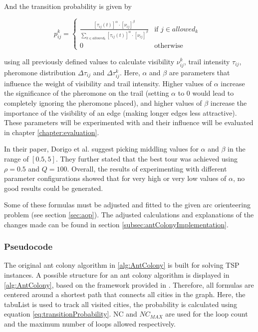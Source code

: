 And the transition probability is given by

\begin{equation}\label{eq:transitionProbability}
	p_{ij}^k = \begin{cases}
		\frac{[\tau_{ij}(t)]^{\alpha} \cdot [\nu_{ij}]^{\beta}}{\sum_{k \in allowed_k} [\tau_{ij}(t)]^{\alpha} \cdot [\nu_{ij}]^{\beta}} &\text{if $j \in allowed_k$ }\\
		0 &\text{otherwise}
	\end{cases}
\end{equation}

using all previously defined values to calculate visibility $\nu_{ij}^k$, trail intensity $\tau_{ij}$, pheromone distribution $\Delta\tau_{ij}$ and $\Delta\tau_{ij}^k$.
Here, $\alpha$ and $\beta$ are parameters that influence the weight of visibility and trail intensity.
Higher values of $\alpha$ increase the significance of the pheromone on the trail (setting $\alpha$ to 0 would lead to completely ignoring the pheromone placed), and higher values of $\beta$ increase the importance of the visibility of an edge (making longer edges less attractive).
These parameters will be experimented with and their influence will be evaluated in chapter \ref{chapter:evaluation}.

In their paper, Dorigo et al. suggest picking middling values for $\alpha$ and $\beta$ in the range of $[0.5,5]$.
They further stated that the best tour was achieved using $\rho = 0.5$ and $Q=100$.
Overall, the results of experimenting with different parameter configurations showed that for very high or very low values of $\alpha$, no good results could be generated.


Some of these formulas must be adjusted and fitted to the given arc orienteering problem (see section \ref{sec:aop}). 
The adjusted calculations and explanations of the changes made can be found in section \ref{subsec:antColonyImplementation}.


\subsubsection{Pseudocode}
\label{subsubsec:antPseudocode}

The original ant colony algorithm in \ref{alg:AntColony} is built for solving TSP instances. 
A possible structure for an ant colony algorithm is displayed in \ref{alg:AntColony}, based on the framework provided in \cite{dorigo_ant_1996}.
Therefore, all formulas are centered around a shortest path that connects all cities in the graph.
Here, the tabuList is used to track all visited cities, the probability is calculated using equation \ref{eq:transitionProbability}. 
NC and $NC_{MAX}$ are used for the loop count and the maximum number of loops allowed respectively.

